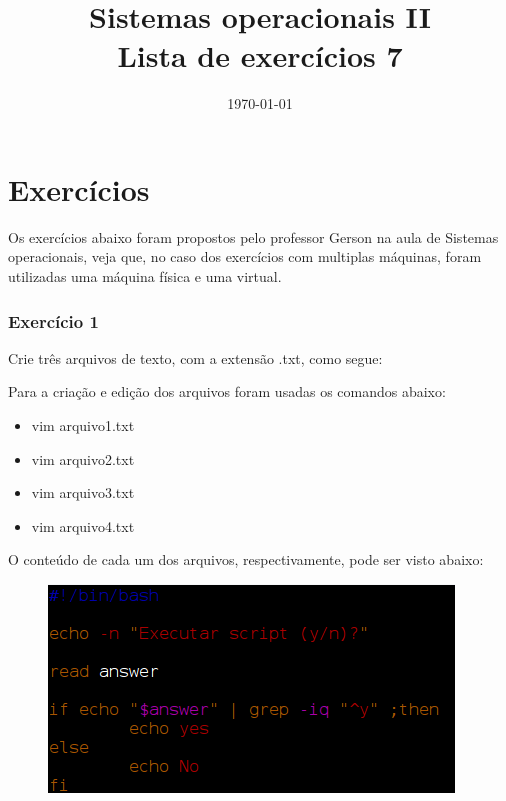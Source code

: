 \documentclass[
	12pt,				%
	openany,			%
	a4paper,			%
	chapter=TITLE,		%
	section=TITLE,		%
	english,
	brazil				%
]{abntex2}
\title{Sistemas operacionais II \\ Lista de exercícios 7}
\date{\today}
\begin{document}
\maketitle

\chapter{Exercícios}

Os exercícios abaixo foram propostos pelo professor Gerson na aula de Sistemas operacionais, veja que, no caso dos exercícios com multiplas máquinas, foram utilizadas uma máquina física e uma virtual.

\subsection{Exercício 1}

Crie três arquivos de texto, com a extensão .txt, como segue:

Para a criação e edição dos arquivos foram usadas os comandos abaixo:
\begin{itemize}
	\item vim arquivo1.txt
	\item vim arquivo2.txt
	\item vim arquivo3.txt
	\item vim arquivo4.txt
\end{itemize}

O conteúdo de cada um dos arquivos, respectivamente, pode ser visto abaixo:

\begin{figure}[H]
  \centering
  \includegraphics[scale=0.5]{arquivo1.png}
\end{figure}
\end{document}
